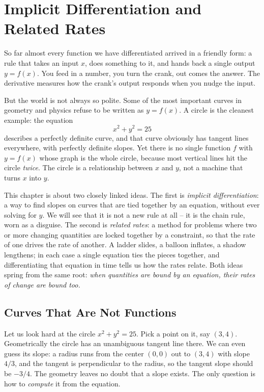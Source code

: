 \chapter{Implicit Differentiation and Related Rates}

So far almost every function we have differentiated arrived in a friendly form: a rule that takes an
input $x$, does something to it, and hands back a single output $y = f(x)$. You feed in a number,
you turn the crank, out comes the answer. The derivative measures how the crank's output responds
when you nudge the input.

But the world is not always so polite. Some of the most important curves in geometry and physics
refuse to be written as $y = f(x)$. A circle is the cleanest example: the equation
\[
x^2 + y^2 = 25
\]
describes a perfectly definite curve, and that curve obviously has tangent lines everywhere, with
perfectly definite slopes. Yet there is no single function $f$ with $y = f(x)$ whose graph is the
whole circle, because most vertical lines hit the circle \emph{twice}. The circle is a relationship
between $x$ and $y$, not a machine that turns $x$ into $y$.

This chapter is about two closely linked ideas. The first is \emph{implicit differentiation}: a way
to find slopes on curves that are tied together by an equation, without ever solving for $y$. We will
see that it is not a new rule at all -- it is the chain rule, worn as a disguise. The second is
\emph{related rates}: a method for problems where two or more changing quantities are locked together
by a constraint, so that the rate of one drives the rate of another. A ladder slides, a balloon
inflates, a shadow lengthens; in each case a single equation ties the pieces together, and
differentiating that equation in time tells us how the rates relate. Both ideas spring from the same
root: \emph{when quantities are bound by an equation, their rates of change are bound too.}

\section{Curves That Are Not Functions}
\label{ch13:not-functions}

Let us look hard at the circle $x^2 + y^2 = 25$. Pick a point on it, say $(3,4)$. Geometrically the
circle has an unambiguous tangent line there. We can even guess its slope: a radius runs from the
center $(0,0)$ out to $(3,4)$ with slope $4/3$, and the tangent is perpendicular to the radius, so
the tangent slope should be $-3/4$. The geometry leaves no doubt that a slope exists. The only
question is how to \emph{compute} it from the equation.

